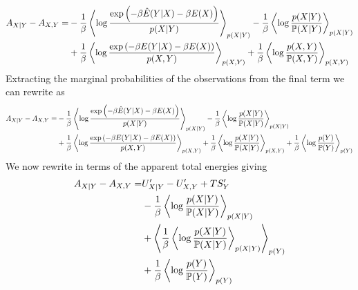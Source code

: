\documentclass[]{article}
\begin{document}
\begin{align*}
A_{X|Y} - A_{X,Y} =  & -\frac{1}{\beta}\left\langle \log \frac{\exp\left(-\beta \hat{E}(Y|X) -\beta E(X)\right)}{p(X|Y) } \right\rangle_{p(X|Y) } - \frac{1}{\beta}\left\langle \log \frac{p(X|Y)}{\mathbb{P}(X|Y) } \right\rangle_{p(X|Y) }\\
& +\frac{1}{\beta}\left\langle \log \frac{\exp\left(-\beta E(Y|X) -\beta E(X)\right)}{p(X,Y) } \right\rangle_{p(X,Y) } + \frac{1}{\beta}\left\langle \log \frac{p(X,Y)}{\mathbb{P}(X,Y) } \right\rangle_{p(X,Y) }
\end{align*} 
Extracting the marginal probabilities of the observations from the final term we can rewrite as 
\begin{align*}
A_{X|Y} - A_{X,Y} =  & -\frac{1}{\beta}\left\langle \log \frac{\exp\left(-\beta \hat{E}(Y|X) -\beta E(X)\right)}{p(X|Y) } \right\rangle_{p(X|Y) } - \frac{1}{\beta}\left\langle \log \frac{p(X|Y)}{\mathbb{P}(X|Y) } \right\rangle_{p(X|Y) }\\
& +\frac{1}{\beta}\left\langle \log \frac{\exp\left(-\beta E(Y|X) -\beta E(X)\right)}{p(X,Y) } \right\rangle_{p(X,Y) } + \frac{1}{\beta}\left\langle \log \frac{p(X|Y)}{\mathbb{P}(X|Y) } \right\rangle_{p(X,Y) } + \frac{1}{\beta}\left\langle \log \frac{p(Y)}{\mathbb{P}(Y) } \right\rangle_{p(Y) }
\end{align*}
We now rewrite in terms of the apparent total energies giving 
\begin{align*}
A_{X|Y} - A_{X,Y} =  & U^\prime_{X|Y} - U^\prime_{X,Y} + TS^\prime_Y \\
& - \frac{1}{\beta}\left\langle \log\frac{p(X|Y)}{\mathbb{P}(X|Y) } \right\rangle_{p(X|Y) } \\
 & + \left\langle \frac{1}{\beta}\left\langle \log \frac{p(X|Y)}{\mathbb{P}(X|Y) } \right\rangle_{p(X|Y) } \right\rangle_{p(Y)}\\
&  + \frac{1}{\beta}\left\langle \log \frac{p(Y)}{\mathbb{P}(Y) } \right\rangle_{p(Y) }
\end{align*}
\end{document}
